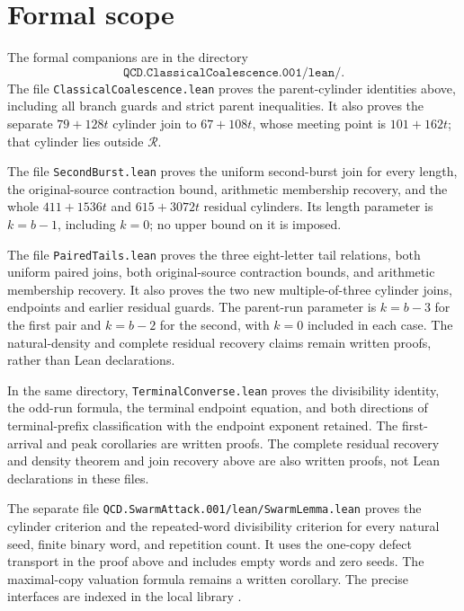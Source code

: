 \documentclass[11pt,letterpaper]{article}
\begin{document}
\section{Formal scope}

The formal companions are in the directory
\[
\texttt{QCD.ClassicalCoalescence.001/lean/}.
\]
The file \nolinkurl{ClassicalCoalescence.lean} proves the parent-cylinder
identities above, including all branch guards and strict parent inequalities. It also proves the separate
\(79+128t\) cylinder join to \(67+108t\), whose meeting point is
\(101+162t\); that cylinder lies outside \(\mathcal R\).

The file \nolinkurl{SecondBurst.lean} proves the uniform second-burst
join for every length, the original-source contraction bound, arithmetic
membership recovery, and the whole \(411+1536t\) and \(615+3072t\)
residual cylinders. Its length parameter is \(k=b-1\), including
\(k=0\); no upper bound on it is imposed.

The file \nolinkurl{PairedTails.lean} proves the three eight-letter tail
relations, both uniform paired joins, both original-source contraction
bounds, and arithmetic membership recovery. It also proves the two
new multiple-of-three cylinder joins, endpoints and earlier residual
guards. The parent-run parameter is \(k=b-3\) for the first pair and
\(k=b-2\) for the second, with \(k=0\) included in each case.
The natural-density and complete residual recovery claims remain written
proofs, rather than Lean declarations.

In the same directory, \nolinkurl{TerminalConverse.lean} proves the
divisibility identity, the odd-run formula, the terminal
endpoint equation, and both directions of terminal-prefix classification
with the endpoint exponent retained. The first-arrival and peak
corollaries are written proofs. The complete residual recovery and
density theorem and join recovery above are also written proofs, not Lean
declarations in these files.

The separate file
\nolinkurl{QCD.SwarmAttack.001/lean/SwarmLemma.lean} proves the
cylinder criterion and the repeated-word divisibility criterion for every
natural seed, finite binary word, and repetition count. It uses the one-copy
defect transport in the proof above and includes empty words and zero seeds.
The maximal-copy valuation formula remains a written corollary.
The precise interfaces are indexed in the local library \cite{Library}.



\end{document}
